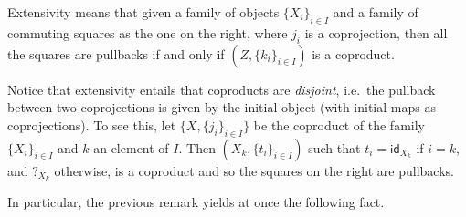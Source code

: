 \documentclass[3p]{elsarticle}
\def\X{\textbf {\textup{X}}}
\newcommand{\id}[1]{\mathsf{id}_{#1}}
\theoremstyle{remark}
\theoremstyle{definition}
\begin{document}
\noindent 
\parbox{11.5cm}{\hspace{15pt} Extensivity means that given a family of objects $\{X_{i}\}_{i\in I}$ and a family of commuting squares as the one on the right, where $j_i$ is a  coprojection, then all the squares are pullbacks if and only if $(Z, \{k_i\}_{i\in I})$ is a coproduct.}\hfill 
\parbox{2cm}{}

\noindent
\parbox{11.5cm}{
\begin{rem}\label{rem:disj}
	Notice that extensivity entails that coproducts are \emph{disjoint}, i.e.~the pullback between two coprojections is given by the initial object (with initial maps as coprojections). To see this, let $\{X, \{j_i\}_{i\in I}\}$ be the coproduct of the family $\{X_i\}_{i\in I}$ and $k$ an element of $I$. Then  $(X_k, \{t_i\}_{i\in I})$ 
such that $t_i = \id{X_k}$ if $i=k$, and $?_{X_k}$ otherwise,
	is a coproduct and so the squares on the right are pullbacks.
\end{rem}}\hfill\parbox{2cm}{ \xymatrix@R=15pt{X_k \ar[r]_{\id{X}} \ar[d]_{\id{X}}& X_k \ar@{>->}[d]^{j_k}\\X_k \ar@{>->}[r]^{j_k} & X}}

In particular, the previous remark yields at once the following fact.
\end{document}
